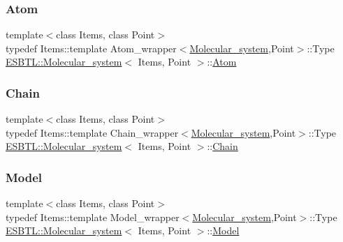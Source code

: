 \subsubsection{\texorpdfstring{Atom}{Atom}}
{\footnotesize\ttfamily template$<$class Items, class Point$>$ \\
typedef Items\+::template Atom\+\_\+wrapper$<$\hyperlink{classESBTL_1_1Molecular__system}{Molecular\+\_\+system},Point$>$\+::Type \hyperlink{classESBTL_1_1Molecular__system}{E\+S\+B\+T\+L\+::\+Molecular\+\_\+system}$<$ Items, Point $>$\+::\hyperlink{classESBTL_1_1Molecular__system_aae37491a328fde3bc58171d68c998c7c}{Atom}}

\mbox{\label{classESBTL_1_1Molecular__system_a7d3b3623db6fbe82b1f4a73138894617}} 
\subsubsection{\texorpdfstring{Chain}{Chain}}
{\footnotesize\ttfamily template$<$class Items, class Point$>$ \\
typedef Items\+::template Chain\+\_\+wrapper$<$\hyperlink{classESBTL_1_1Molecular__system}{Molecular\+\_\+system},Point$>$\+::Type \hyperlink{classESBTL_1_1Molecular__system}{E\+S\+B\+T\+L\+::\+Molecular\+\_\+system}$<$ Items, Point $>$\+::\hyperlink{classESBTL_1_1Molecular__system_a7d3b3623db6fbe82b1f4a73138894617}{Chain}}

\mbox{\label{classESBTL_1_1Molecular__system_ac99c9f22457fd0498324fb5cfc276227}} 
\subsubsection{\texorpdfstring{Model}{Model}}
{\footnotesize\ttfamily template$<$class Items, class Point$>$ \\
typedef Items\+::template Model\+\_\+wrapper$<$\hyperlink{classESBTL_1_1Molecular__system}{Molecular\+\_\+system},Point$>$\+::Type \hyperlink{classESBTL_1_1Molecular__system}{E\+S\+B\+T\+L\+::\+Molecular\+\_\+system}$<$ Items, Point $>$\+::\hyperlink{classESBTL_1_1Molecular__system_ac99c9f22457fd0498324fb5cfc276227}{Model}}

